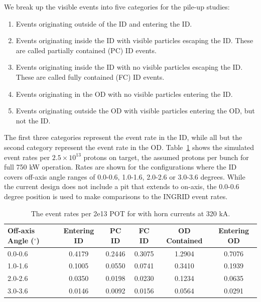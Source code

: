We break up the visible events into five categories for the pile-up studies:
\begin{enumerate}
\item Events originating outside of the ID and entering the ID.
\item Events originating inside the ID with visible particles escaping the ID.  These are called partially contained (PC) ID events.
\item Events originating inside the ID with no visible particles escaping the ID.  These are called fully contained (FC) ID events.
\item Events originating in the OD with no visible particles entering the ID.  
\item Events originating outside the OD with visible particles entering the OD, but not the ID.
\end{enumerate}
The first three categories represent the event rate in the ID, while all but the second category represent the event rate
in the OD.  Table~\ref{tab:pileup} shows the simulated event rates per $2.5\times10^{13}$ protons on target, the assumed protons per bunch for full
750 kW operation.  Rates are shown for the \nuprismlite configurations where the ID covers off-axis angle ranges of 0.0-0.6, 1.0-1.6,
2.0-2.6 or 3.0-3.6 degrees.  While the current design does not include a pit that extends to on-axis, the 0.0-0.6 degree position is used
to make comparisons to the INGRID event rates.

\begin{table}
\begin{center}
\caption{The event rates per 2e13 POT for \nuprismlite with horn currents at 320 kA.}
\label{tab:pileup}
\begin{tabular}{l|c|c|c|c|c}
\hline
Off-axis Angle ($^{\circ}$) & Entering ID & PC ID  & FC ID  & OD Contained  & Entering OD    \\ \hline
0.0-0.6                     & 0.4179      & 0.2446 & 0.3075 & 1.2904        & 0.7076 \\
1.0-1.6                     & 0.1005      & 0.0550 & 0.0741 & 0.3410        & 0.1939 \\
2.0-2.6                     & 0.0350      & 0.0198 & 0.0230 & 0.1234        & 0.0635 \\
3.0-3.6                     & 0.0146      & 0.0092 & 0.0156 & 0.0564        & 0.0291 \\ \hline
\end{tabular}
\end{center}
\end{table}

